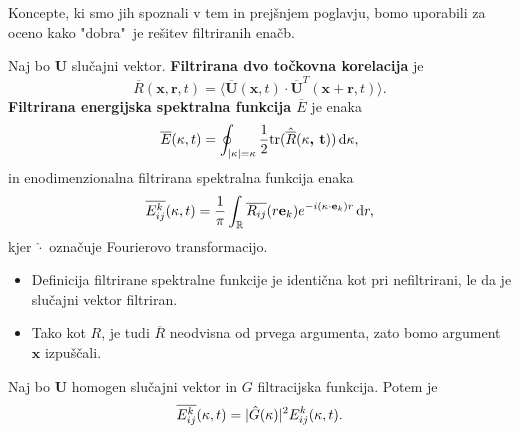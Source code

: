 \documentclass[mat2, tisk]{fmfdelo}
\newcommand{\R}{\mathbb R}
\newcommand{\bd}{\textbf}
\begin{document}
Koncepte, ki smo jih spoznali v tem in prejšnjem poglavju, bomo 
uporabili za oceno kako "dobra"\, je rešitev filtriranih enačb.

\begin{definicija}
Naj bo $\bd{U}$ slučajni vektor. \bd{Filtrirana dvo točkovna korelacija}
je 
\begin{equation*}
\overline{R}(\bd{x},\bd{r},t) = \langle \overline{\bd{U}}(\bd{x}, t) \cdot \overline{\bd{U}}^T(\bd{x} + \bd{r}, t) \rangle.
\end{equation*} 
\bd{Filtrirana energijska spektralna funkcija $\overline{E}$} je enaka
\begin{equation*}
\overline{E}(\kappa, t) = \oint_{|\bd{\text{$\kappa$}}| = \kappa} \frac{1}{2} \text{tr}(\hat{\overline{R}}(\bd{\text{$\kappa$}, t})) \dif \bd{\text{$\kappa$}},
\end{equation*}
in enodimenzionalna filtrirana spektralna funkcija enaka 
\begin{equation*}
\overline{E_{ij}^k}(\bd{\text{$\kappa$}}, t) = \frac{1}{\pi} \int_{\R} \overline{R_{ij}}(r\bd{e}_k) e^{-i (\bd{\text{$\kappa$}} \cdot \bd{e}_k) r} \dif {r},
\end{equation*}
kjer $\hat{\cdot}$ označuje Fourierovo transformacijo.
\end{definicija}

\begin{opomba}
\hfill
\begin{itemize}
  \item Definicija filtrirane spektralne funkcije je identična kot pri nefiltrirani,
  le da je slučajni vektor filtriran.
  \item Tako kot $R$, je tudi $\overline{R}$ neodvisna od prvega argumenta, zato bomo argument $\bd{x}$ izpuščali.
\end{itemize}
\end{opomba}

\begin{lema}
Naj bo $\bd{U}$ homogen slučajni vektor in $G$ filtracijska funkcija. Potem je
\begin{equation*}
\overline{E_{ij}^k}(\bd{\text{$\kappa$}}, t) = |\hat{G}(\bd{\text{$\kappa$}})|^2 {E_{ij}^k}(\bd{\text{$\kappa$}}, t).
\end{equation*}
\end{lema}
\end{document}
